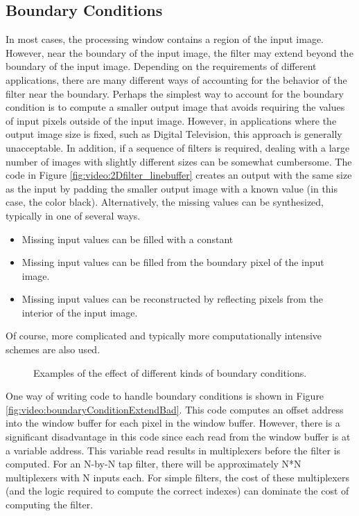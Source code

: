 \subsection{Boundary Conditions}

In most cases, the processing window contains a region of the input image.  However, near the boundary of the input image, the filter may extend beyond the boundary of the input image.  Depending on the requirements of different applications, there are many different ways of accounting for the behavior of the filter near the boundary.  Perhaps the simplest way to account for the boundary condition is to compute a smaller output image that avoids requiring the values of input pixels outside of the input image.  However, in applications where the output image size is fixed, such as Digital Television, this approach is generally unacceptable.  In addition, if a sequence of filters is required, dealing with a large number of images with slightly different sizes can be somewhat cumbersome.  The code in Figure \ref{fig:video:2Dfilter_linebuffer} creates an output with the same size as the input by padding the smaller output image with a known value (in this case, the color black).   Alternatively, the missing values can be synthesized, typically in one of several ways.
\begin{itemize}
\item Missing input values can be filled with a constant
\item Missing input values can be filled from the boundary pixel of the input image.
\item Missing input values can be reconstructed by reflecting pixels from the interior of the input image.
\end{itemize}
Of course, more complicated and typically more computationally intensive schemes are also used.

\begin{figure}
\centering

\caption{Examples of the effect of different kinds of boundary conditions.}\label{fig:video:boundary_conditions}
\end{figure}

One way of writing code to handle boundary conditions is shown in Figure \ref{fig:video:boundaryConditionExtendBad}.  This code computes an offset address into the window buffer for each pixel in the window buffer.  However, there is a significant disadvantage in this code since each read from the window buffer is at a variable address.  This variable read results in multiplexers before the filter is computed.  For an N-by-N tap filter, there will be approximately N*N multiplexers with N inputs each.  For simple filters, the cost of these multiplexers (and the logic required to compute the correct indexes) can dominate the cost of computing the filter.

